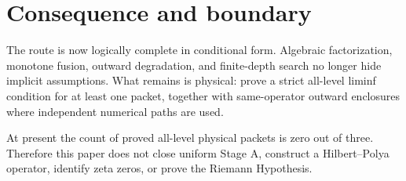 \documentclass[12pt]{article}
\begin{document}
\section{Consequence and boundary}
The route is now logically complete in conditional form.  Algebraic
factorization, monotone fusion, outward degradation, and finite-depth search
no longer hide implicit assumptions.  What remains is physical: prove a
strict all-level liminf condition for at least one packet, together with
same-operator outward enclosures where independent numerical paths are used.

At present the count of proved all-level physical packets is zero out of
three.  Therefore this paper does not close uniform Stage A, construct a
Hilbert--Polya operator, identify zeta zeros, or prove the Riemann Hypothesis.



\end{document}
